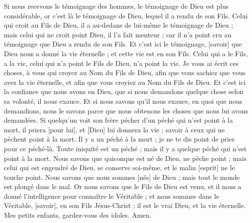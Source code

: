 \begin{multicols}{2}
Si nous recevons le témoignage des hommes, le témoignage de Dieu est plus considérable, or c'est là le témoignage de Dieu, lequel il a rendu de son Fils.
Celui qui croit au Fils de Dieu, il a au-dedans de lui-même le témoignage de Dieu ; mais celui qui ne croit point Dieu, il l'a fait menteur ; car il n'a point cru au témoignage que Dieu a rendu de son Fils.
Et c'est ici le témoignage, [savoir] que Dieu nous a donné la vie éternelle ; et cette vie est en son Fils.
Celui qui a le Fils, a la vie, celui qui n'a point le Fils de Dieu, n'a point la vie.
Je vous ai écrit ces choses, à vous qui croyez au Nom du Fils de Dieu, afin que vous sachiez que vous avez la vie éternelle, et afin que vous croyiez au Nom du Fils de Dieu.
Et c'est ici la confiance que nous avons en Dieu, que si nous demandons quelque chose selon sa volonté, il nous exauce.
Et si nous savons qu'il nous exauce, en quoi que nous demandions, nous le savons parce que nous obtenons les choses que nous lui avons demandées.
Si quelqu'un voit son frère pécher d'un péché qui n'est point à la mort, il priera [pour lui], et [Dieu] lui donnera la vie ; savoir à ceux qui ne pèchent point à la mort. Il y a un péché à la mort ; je ne te dis point de prier pour ce péché-là.
Toute iniquité est un péché ; mais il y a quelque péché qui n'est point à la mort.
Nous savons que quiconque est né de Dieu, ne pèche point ; mais celui qui est engendré de Dieu, se conserve soi-même, et le malin [esprit] ne le touche point.
Nous savons que nous sommes [nés] de Dieu ; mais tout le monde est plongé dans le mal.
Or nous savons que le Fils de Dieu est venu, et il nous a donné l'intelligence pour connaître le Véritable ; et nous sommes dans le Véritable, [savoir], en son Fils Jésus-Christ ; il est le vrai Dieu, et la vie éternelle.
Mes petits enfants, gardez-vous des idoles. Amen.
\PPE{}
\end{multicols}
